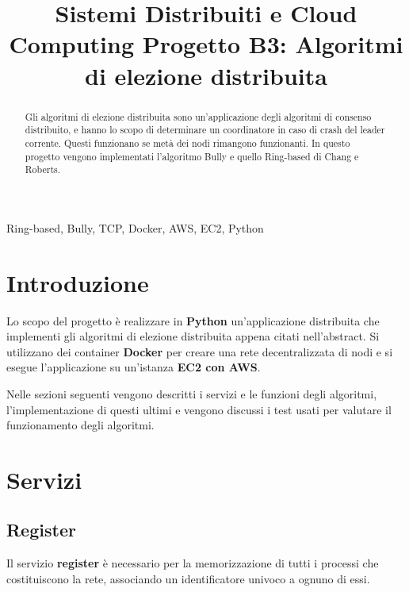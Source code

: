 \documentclass[conference]{IEEEtran}
\begin{document}
\title{Sistemi Distribuiti e Cloud Computing
Progetto B3: Algoritmi di elezione distribuita}

\author{
}

\maketitle

\begin{abstract}
Gli algoritmi di elezione distribuita sono un'applicazione degli algoritmi di consenso distribuito, e hanno lo scopo di determinare un coordinatore in caso di crash del leader corrente.
Questi funzionano se metà dei nodi rimangono funzionanti.
In questo progetto vengono implementati l'algoritmo Bully e quello Ring-based di Chang e Roberts.
\end{abstract}

\begin{IEEEkeywords}
Ring-based, Bully, TCP, Docker, AWS, EC2, Python
\end{IEEEkeywords}


\section{Introduzione}\label{sec:intro}
Lo scopo del progetto è realizzare in \textbf{Python} un'applicazione distribuita che implementi gli algoritmi di elezione distribuita appena citati nell'abstract.
Si utilizzano dei container \textbf{Docker} per creare una rete decentralizzata di nodi e si esegue l'applicazione su un'istanza \textbf{EC2 con AWS}.

Nelle sezioni seguenti vengono descritti i servizi e le funzioni degli algoritmi, l'implementazione di questi ultimi e vengono discussi i test usati per valutare il funzionamento degli algoritmi.


\section{Servizi}\label{sec:services}


\subsection{Register}\label{register}

Il servizio \textbf{register} è necessario per la memorizzazione di tutti i processi che costituiscono la rete, associando un identificatore univoco a ognuno di essi.
\end{document}

